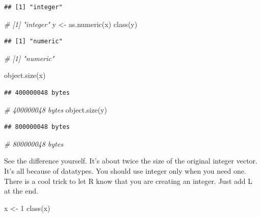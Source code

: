 \documentclass[
]{book}
\newenvironment{Shaded}{\begin{snugshade}}{\end{snugshade}}
\newcommand{\CommentTok}[1]{\textcolor[rgb]{0.56,0.35,0.01}{\textit{#1}}}
\newcommand{\DecValTok}[1]{\textcolor[rgb]{0.00,0.00,0.81}{#1}}
\newcommand{\FunctionTok}[1]{\textcolor[rgb]{0.00,0.00,0.00}{#1}}
\newcommand{\NormalTok}[1]{#1}
\newcommand{\OtherTok}[1]{\textcolor[rgb]{0.56,0.35,0.01}{#1}}
\begin{document}
\begin{verbatim}
## [1] "integer"
\end{verbatim}

\begin{Shaded}
\begin{Highlighting}[]
\CommentTok{\# [1] "integer"}
\NormalTok{y }\OtherTok{\textless{}{-}} \FunctionTok{as.numeric}\NormalTok{(x)}
\FunctionTok{class}\NormalTok{(y)}
\end{Highlighting}
\end{Shaded}

\begin{verbatim}
## [1] "numeric"
\end{verbatim}

\begin{Shaded}
\begin{Highlighting}[]
\CommentTok{\# [1] "numeric"}

\FunctionTok{object.size}\NormalTok{(x)}
\end{Highlighting}
\end{Shaded}

\begin{verbatim}
## 400000048 bytes
\end{verbatim}

\begin{Shaded}
\begin{Highlighting}[]
\CommentTok{\# 400000048 bytes}
\FunctionTok{object.size}\NormalTok{(y)}
\end{Highlighting}
\end{Shaded}

\begin{verbatim}
## 800000048 bytes
\end{verbatim}

\begin{Shaded}
\begin{Highlighting}[]
\CommentTok{\# 800000048 bytes}
\end{Highlighting}
\end{Shaded}

See the difference yourself. It's about twice the size of the original integer vector. It's all because of datatypes. You should use integer only when you need one. There is a cool trick to let R know that you are creating an integer. Just add L at the end.

\begin{Shaded}
\begin{Highlighting}[]
\NormalTok{x }\OtherTok{\textless{}{-}} \DecValTok{1}
\FunctionTok{class}\NormalTok{(x)}
\end{Highlighting}
\end{Shaded}
\end{document}
